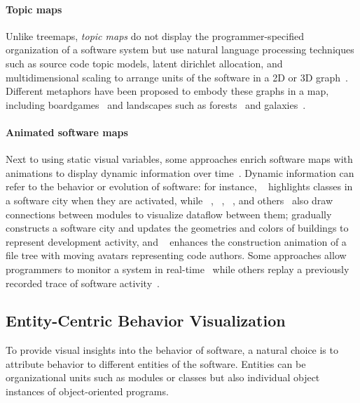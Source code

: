 \paragraph{Topic maps}

Unlike treemaps, \emph{topic maps} do not display the programmer-specified organization of a software system but use natural language processing techniques such as source code topic models, latent dirichlet allocation, and multidimensional scaling to arrange units of the software in a 2D or 3D graph~\cite{atzberger2023visualization}.
Different metaphors have been proposed to embody these graphs in a map, including boardgames~\cite{atzberger2022visualization} and landscapes such as forests~\cite{atzberger2021softwareforest} and galaxies~\cite{atzberger2021softwaregalaxies}.

\paragraph{Animated software maps}

Next to using static visual variables, some approaches enrich software maps with animations to display dynamic information over time~\cite[sec. 3.4]{lemieux2006visualization}.
Dynamic information can refer to the behavior or evolution of software:
for instance, ~\cite{dugerdil2008execution} highlights classes in a software city when they are activated, while ~\cite{dashuber2022trace}, ~\cite{krause2021live}, ~\cite{waller2013synchrovis}, and others~\cite{ciolkowski20173d} also draw connections between modules to visualize dataflow between them;
\Cite{langelier2008exploring} gradually constructs a software city and updates the geometries and colors of buildings to represent development activity, and ~\cite{caudwell2010gource} enhances the construction animation of a file tree with moving avatars representing code authors.
Some approaches allow programmers to monitor a system in real-time~\cite{fittkau2013live} while others replay a previously recorded trace of software activity~\cite{dugerdil2008execution}.

\subsection{Entity-Centric Behavior Visualization}

To provide visual insights into the behavior of software, a natural choice is to attribute behavior to different entities of the software.
Entities can be organizational units such as modules or classes but also individual object instances of object-oriented programs.

